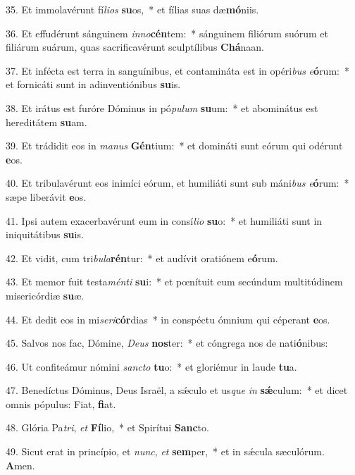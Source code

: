 35. Et immolavérunt fí\textit{li}\textit{os} \textbf{su}os,~*  et fílias suas dæ\textbf{mó}niis.\

36. Et effudérunt sánguinem \textit{in}\textit{no}\textbf{cén}tem:~*  sánguinem filiórum suórum et filiárum suárum, quas sacrificavérunt sculptílibus \textbf{Chá}naan.\

37. Et infécta est terra in sanguínibus, et contamináta est in opéri\textit{bus} \textit{e}\textbf{ó}rum:~*  et fornicáti sunt in adinventiónibus \textbf{su}is.\

38. Et irátus est furóre Dóminus in pó\textit{pu}\textit{lum} \textbf{su}um:~*  et abominátus est hereditátem \textbf{su}am.\

39. Et trádidit eos in \textit{ma}\textit{nus} \textbf{Gén}tium:~*  et domináti sunt eórum qui odérunt \textbf{e}os.\

40. Et tribulavérunt eos inimíci eórum, et humiliáti sunt sub máni\textit{bus} \textit{e}\textbf{ó}rum:~*  sæpe liberávit \textbf{e}os.\

41. Ipsi autem exacerbavérunt eum in consí\textit{li}\textit{o} \textbf{su}o:~*  et humiliáti sunt in iniquitátibus \textbf{su}is.\

42. Et vidit, cum tri\textit{bu}\textit{la}\textbf{rén}tur:~*  et audívit oratiónem e\textbf{ó}rum.\

43. Et memor fuit testa\textit{mén}\textit{ti} \textbf{su}i:~*  et pœnítuit eum secúndum multitúdinem misericórdiæ \textbf{su}æ.\

44. Et dedit eos in mi\textit{se}\textit{ri}\textbf{cór}dias~*  in conspéctu ómnium qui céperant \textbf{e}os.\

45. Salvos nos fac, Dómine, \textit{De}\textit{us} \textbf{nos}ter:~*  et cóngrega nos de nati\textbf{ó}nibus:\

46. Ut confiteámur nómini \textit{sanc}\textit{to} \textbf{tu}o:~*  et gloriémur in laude \textbf{tu}a.\

47. Benedíctus Dóminus, Deus Israël, a sǽculo et us\textit{que} \textit{in} \textbf{sǽ}culum:~*  et dicet omnis pópulus: Fiat, \textbf{fi}at.\

48. Glória Pa\textit{tri}, \textit{et} \textbf{Fí}lio,~*  et Spirítui \textbf{Sanc}to.\

49. Sicut erat in princípio, et \textit{nunc}, \textit{et} \textbf{sem}per,~*  et in sǽcula sæculórum. \textbf{A}men.\

